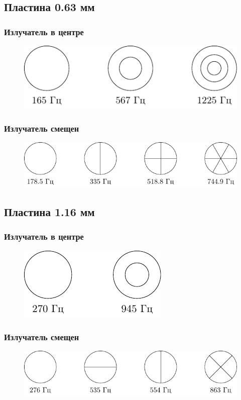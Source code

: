 \documentclass[a4paper,14pt]{extarticle}
\begin{document}
\subsection{Пластина 0.63 мм}
\subsubsection{Излучатель в центре}
\begin{figure}[H]
	\centering
	\includegraphics[scale=1.5]{fig/63_c.pdf}
\end{figure}
\subsubsection{Излучатель смещен}
\begin{figure}[H]
	\centering
	\includegraphics[scale=1.5]{fig/63_b.pdf}
\end{figure}
\subsection{Пластина 1.16 мм}
\subsubsection{Излучатель в центре}
\begin{figure}[H]
	\centering
	\includegraphics[scale=1.5]{fig/116_c.pdf}
\end{figure}
\subsubsection{Излучатель смещен}
\begin{figure}[H]
	\centering
	\includegraphics[scale=1.5]{fig/116_b.pdf}
\end{figure}
\end{document}
